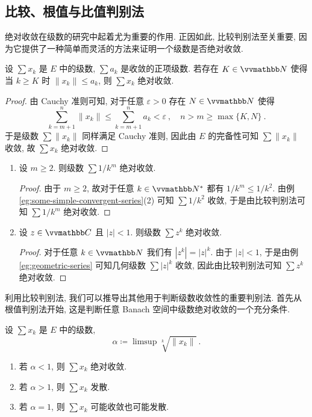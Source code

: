 \subsection{比较、根值与比值判别法}

绝对收敛在级数的研究中起着尤为重要的作用. 正因如此, 比较判别法至关重要, 因为它提供了一种简单而灵活的方法来证明一个级数是否绝对收敛.

\begin{theorem}[比较判别法]
    设 \(\sum x_k\) 是 \(E\) 中的级数, \(\sum a_k\) 是收敛的正项级数. 若存在 \(K \in \N\) 使得当 \(k \geq K\) 时 \(\|x_k\| \leq a_k\), 则 \(\sum x_k\) 绝对收敛.
\end{theorem}

\begin{proof}
    由 Cauchy 准则可知, 对于任意 \(\varepsilon > 0\) 存在 \(N \in \N\) 使得
    \[
        \sum_{k = m + 1}^n \|x_k\| \leq \sum_{k = m + 1}^n a_k < \varepsilon\ ,\quad n > m \geq \max\{K, N\}\ .
    \]
    于是级数 \(\sum \|x_k\|\) 同样满足 Cauchy 准则, 因此由 \(E\) 的完备性可知 \(\sum \|x_k\|\) 收敛, 故 \(\sum x_k\) 绝对收敛.
\end{proof}

\begin{example}
    \begin{enumerate}
        \item 设 \(m \geq 2\). 则级数 \(\sum 1 / k^m\) 绝对收敛.
        \begin{proof}
            由于 \(m \geq 2\), 故对于任意 \(k \in \N^\ast\) 都有 \(1 / k^m \leq 1 / k^2\). 由例 \ref{eg:some-simple-convergent-series}(2) 可知 \(\sum 1 / k^2\) 收敛, 于是由比较判别法可知 \(\sum 1 / k^m\) 绝对收敛.
        \end{proof}
        \item 设 \(z \in \C\) 且 \(|z| < 1\). 则级数 \(\sum z^k\) 绝对收敛.
        \begin{proof}
            对于任意 \(k \in \N\) 我们有 \(|z^k| = |z|^k\). 由于 \(|z| < 1\), 于是由例 \ref{eg:geometric-series} 可知几何级数 \(\sum |z|^k\) 收敛, 因此由比较判别法可知 \(\sum z^k\) 绝对收敛.
        \end{proof}
    \end{enumerate}
\end{example}

利用比较判别法, 我们可以推导出其他用于判断级数收敛性的重要判别法. 首先从根值判别法开始, 这是判断任意 Banach 空间中级数绝对收敛的一个充分条件.

\begin{theorem}[根值判别法]
    设 \(\sum x_k\) 是 \(E\) 中的级数,
    \[
        \alpha \coloneqq \limsup \sqrt[k]{\|x_k\|}\ .
    \]
    \begin{enumerate}
        \item 若 \(\alpha < 1\), 则 \(\sum x_k\) 绝对收敛.
        \item 若 \(\alpha > 1\), 则 \(\sum x_k\) 发散.
        \item 若 \(\alpha = 1\), 则 \(\sum x_k\) 可能收敛也可能发散.
    \end{enumerate}
\end{theorem}

